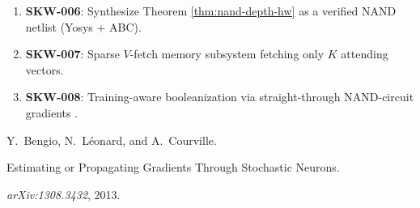 \begin{enumerate}





\item \textbf{SKW-006}: Synthesize Theorem \ref{thm:nand-depth-hw} as a verified NAND netlist (Yosys + ABC).





\item \textbf{SKW-007}: Sparse $V$-fetch memory subsystem fetching only $K$ attending vectors.





\item \textbf{SKW-008}: Training-aware booleanization via straight-through NAND-circuit gradients \cite{bengio2013estimating}.





\end{enumerate}
















Y.~Bengio, N.~L\'eonard, and A.~Courville.





Estimating or Propagating Gradients Through Stochastic Neurons.





\emph{arXiv:1308.3432}, 2013.


























